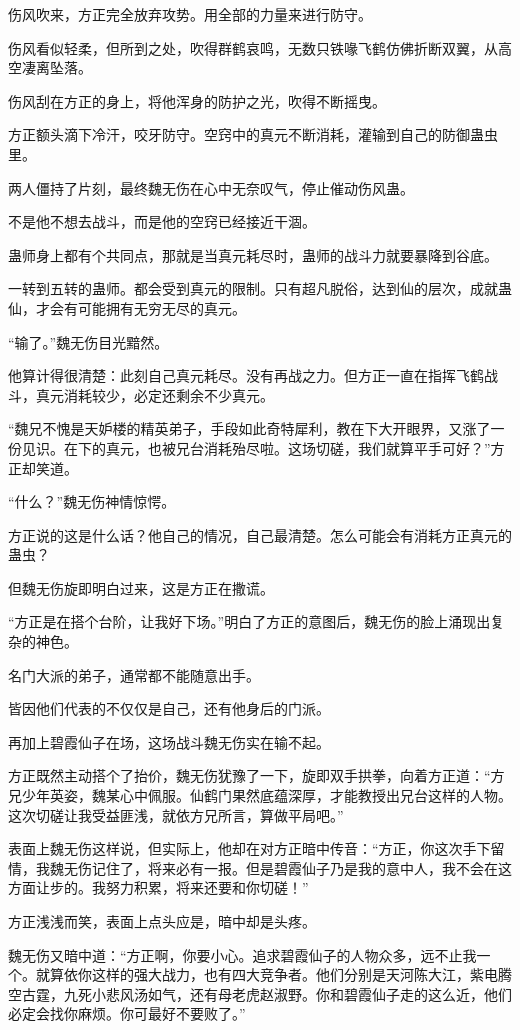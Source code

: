 \begin{this_body}
伤风吹来，方正完全放弃攻势。用全部的力量来进行防守。

伤风看似轻柔，但所到之处，吹得群鹤哀鸣，无数只铁喙飞鹤仿佛折断双翼，从高空凄离坠落。

伤风刮在方正的身上，将他浑身的防护之光，吹得不断摇曳。

方正额头滴下冷汗，咬牙防守。空窍中的真元不断消耗，灌输到自己的防御蛊虫里。

两人僵持了片刻，最终魏无伤在心中无奈叹气，停止催动伤风蛊。

不是他不想去战斗，而是他的空窍已经接近干涸。

蛊师身上都有个共同点，那就是当真元耗尽时，蛊师的战斗力就要暴降到谷底。

一转到五转的蛊师。都会受到真元的限制。只有超凡脱俗，达到仙的层次，成就蛊仙，才会有可能拥有无穷无尽的真元。

“输了。”魏无伤目光黯然。

他算计得很清楚：此刻自己真元耗尽。没有再战之力。但方正一直在指挥飞鹤战斗，真元消耗较少，必定还剩余不少真元。

“魏兄不愧是天妒楼的精英弟子，手段如此奇特犀利，教在下大开眼界，又涨了一份见识。在下的真元，也被兄台消耗殆尽啦。这场切磋，我们就算平手可好？”方正却笑道。

“什么？”魏无伤神情惊愕。

方正说的这是什么话？他自己的情况，自己最清楚。怎么可能会有消耗方正真元的蛊虫？

但魏无伤旋即明白过来，这是方正在撒谎。

“方正是在搭个台阶，让我好下场。”明白了方正的意图后，魏无伤的脸上涌现出复杂的神色。

名门大派的弟子，通常都不能随意出手。

皆因他们代表的不仅仅是自己，还有他身后的门派。

再加上碧霞仙子在场，这场战斗魏无伤实在输不起。

方正既然主动搭个了抬价，魏无伤犹豫了一下，旋即双手拱拳，向着方正道：“方兄少年英姿，魏某心中佩服。仙鹤门果然底蕴深厚，才能教授出兄台这样的人物。这次切磋让我受益匪浅，就依方兄所言，算做平局吧。”

表面上魏无伤这样说，但实际上，他却在对方正暗中传音：“方正，你这次手下留情，我魏无伤记住了，将来必有一报。但是碧霞仙子乃是我的意中人，我不会在这方面让步的。我努力积累，将来还要和你切磋！”

方正浅浅而笑，表面上点头应是，暗中却是头疼。

魏无伤又暗中道：“方正啊，你要小心。追求碧霞仙子的人物众多，远不止我一个。就算依你这样的强大战力，也有四大竞争者。他们分别是天河陈大江，紫电腾空古霆，九死小悲风汤如气，还有母老虎赵淑野。你和碧霞仙子走的这么近，他们必定会找你麻烦。你可最好不要败了。”


\end{this_body}
